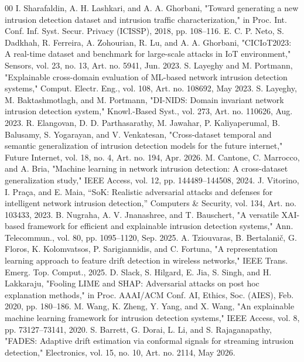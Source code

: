 \documentclass[conference]{IEEEtran}
\begin{document}
\begin{thebibliography}{00}
 I. Sharafaldin, A. H. Lashkari, and A. A. Ghorbani, "Toward generating a new intrusion detection dataset and intrusion traffic characterization," in Proc. Int. Conf. Inf. Syst. Secur. Privacy (ICISSP), 2018, pp. 108--116.
 E. C. P. Neto, S. Dadkhah, R. Ferreira, A. Zohourian, R. Lu, and A. A. Ghorbani, "CICIoT2023: A real-time dataset and benchmark for large-scale attacks in IoT environment," Sensors, vol. 23, no. 13, Art. no. 5941, Jun. 2023.
 S. Layeghy and M. Portmann, "Explainable cross-domain evaluation of ML-based network intrusion detection systems," Comput. Electr. Eng., vol. 108, Art. no. 108692, May 2023.
 S. Layeghy, M. Baktashmotlagh, and M. Portmann, "DI-NIDS: Domain invariant network intrusion detection system," Knowl.-Based Syst., vol. 273, Art. no. 110626, Aug. 2023.
 R. Elangovan, D. D. Parthasarathy, M. Jawahar, P. Kaliyaperumal, B. Balusamy, S. Yogarayan, and V. Venkatesan, "Cross-dataset temporal and semantic generalization of intrusion detection models for the future internet," Future Internet, vol. 18, no. 4, Art. no. 194, Apr. 2026.
 M. Cantone, C. Marrocco, and A. Bria, "Machine learning in network intrusion detection: A cross-dataset generalization study," IEEE Access, vol. 12, pp. 144489--144508, 2024.
 J. Vitorino, I. Praça, and E. Maia, ``SoK: Realistic adversarial attacks and defenses for intelligent network intrusion detection,'' Computers \& Security, vol. 134, Art. no. 103433, 2023.
 B. Nugraha, A. V. Jnanashree, and T. Bauschert, "A versatile XAI-based framework for efficient and explainable intrusion detection systems," Ann. Telecommun., vol. 80, pp. 1095--1120, Sep. 2025.
 A. Tziouvaras, B. Bertalanič, G. Floros, K. Kolomvatsos, P. Sarigiannidis, and C. Fortuna, "A representation learning approach to feature drift detection in wireless networks," IEEE Trans. Emerg. Top. Comput., 2025.
 D. Slack, S. Hilgard, E. Jia, S. Singh, and H. Lakkaraju, "Fooling LIME and SHAP: Adversarial attacks on post hoc explanation methods," in Proc. AAAI/ACM Conf. AI, Ethics, Soc. (AIES), Feb. 2020, pp. 180--186.
 M. Wang, K. Zheng, Y. Yang, and X. Wang, "An explainable machine learning framework for intrusion detection systems," IEEE Access, vol. 8, pp. 73127--73141, 2020.
 S. Barrett, G. Dorai, L. Li, and S. Rajaganapathy, "FADES: Adaptive drift estimation via conformal signals for streaming intrusion detection," Electronics, vol. 15, no. 10, Art. no. 2114, May 2026.

\end{thebibliography}
\end{document}
